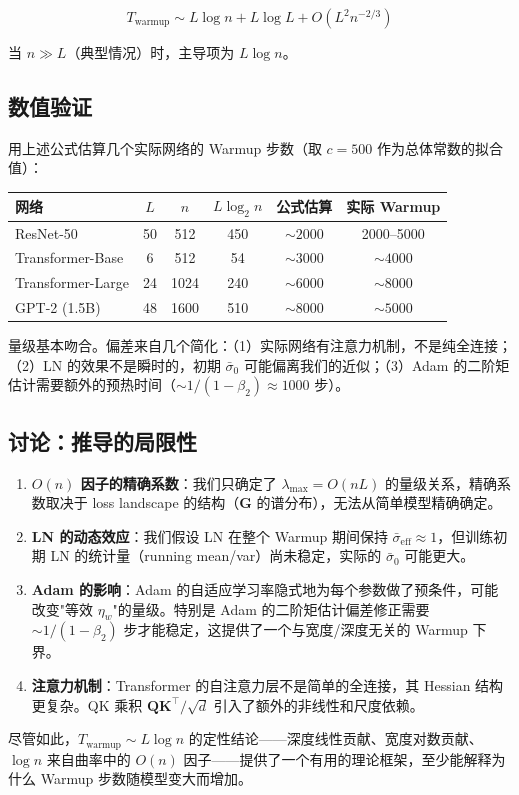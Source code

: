 \documentclass[12pt, a4paper]{ctexart}
\begin{document}
\begin{equation}
    \boxed{T_{\text{warmup}} \sim L\log n + L\log L + O(L^2 n^{-2/3})}
\end{equation}

当 $n \gg L$（典型情况）时，主导项为 $L\log n$。

\subsection{数值验证}

用上述公式估算几个实际网络的 Warmup 步数（取 $c = 500$ 作为总体常数的拟合值）：

\begin{center}
\begin{tabular}{l|ccc|cc}
网络 & $L$ & $n$ & $L\log_2 n$ & 公式估算 & 实际 Warmup \\
\hline
ResNet-50 & 50 & 512 & 450 & $\sim 2000$ & 2000--5000 \\
Transformer-Base & 6 & 512 & 54 & $\sim 3000$ & $\sim 4000$ \\
Transformer-Large & 24 & 1024 & 240 & $\sim 6000$ & $\sim 8000$ \\
GPT-2 (1.5B) & 48 & 1600 & 510 & $\sim 8000$ & $\sim 5000$ \\
\end{tabular}
\end{center}

量级基本吻合。偏差来自几个简化：（1）实际网络有注意力机制，不是纯全连接；（2）LN 的效果不是瞬时的，初期 $\bar{\sigma}_0$ 可能偏离我们的近似；（3）Adam 的二阶矩估计需要额外的预热时间（$\sim 1/(1-\beta_2) \approx 1000$ 步）。

\subsection{讨论：推导的局限性}

\begin{enumerate}
    \item \textbf{$O(n)$ 因子的精确系数}：我们只确定了 $\lambda_{\max} = O(nL)$ 的量级关系，精确系数取决于 loss landscape 的结构（$\mathbf{G}$ 的谱分布），无法从简单模型精确确定。
    \item \textbf{LN 的动态效应}：我们假设 LN 在整个 Warmup 期间保持 $\bar{\sigma}_{\text{eff}} \approx 1$，但训练初期 LN 的统计量（running mean/var）尚未稳定，实际的 $\bar{\sigma}_0$ 可能更大。
    \item \textbf{Adam 的影响}：Adam 的自适应学习率隐式地为每个参数做了预条件，可能改变"等效 $\eta_w$"的量级。特别是 Adam 的二阶矩估计偏差修正需要 $\sim 1/(1-\beta_2)$ 步才能稳定，这提供了一个与宽度/深度无关的 Warmup 下界。
    \item \textbf{注意力机制}：Transformer 的自注意力层不是简单的全连接，其 Hessian 结构更复杂。QK 乘积 $\mathbf{Q}\mathbf{K}^\top/\sqrt{d}$ 引入了额外的非线性和尺度依赖。
\end{enumerate}

尽管如此，$T_{\text{warmup}} \sim L\log n$ 的定性结论——深度线性贡献、宽度对数贡献、$\log n$ 来自曲率中的 $O(n)$ 因子——提供了一个有用的理论框架，至少能解释为什么 Warmup 步数随模型变大而增加。
\end{document}
